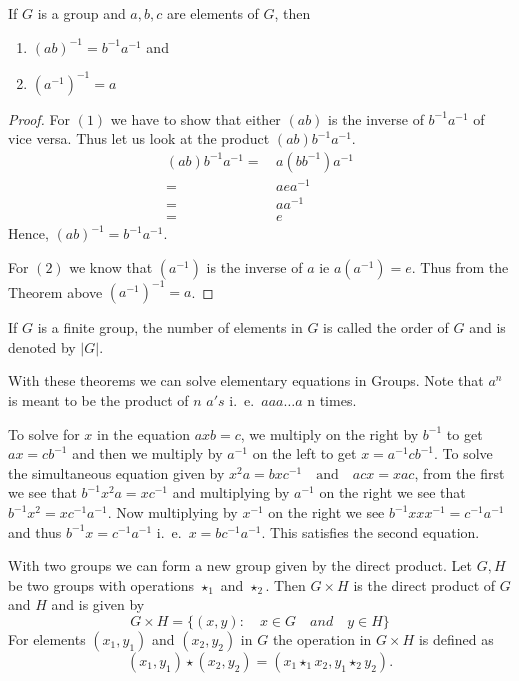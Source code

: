 \begin{Theorem}
    If $G$ is a group and $a,b,c$ are elements of $G$, then 
    \begin{enumerate}
	\item ${(ab)}^{-1} = b^{-1}a^{-1}$ and 
	\item ${(a^{-1})}^{-1} = a$
    \end{enumerate}
\end{Theorem}
\begin{proof}
    For $(1)$ we have to show that either $(ab)$ is the inverse of $b^{-1}a^{-1}$ of vice versa.
    Thus let us look at the product $(ab)b^{-1}a^{-1}$.
    \begin{align*}
	(ab)b^{-1}a^{-1} = & \, a(bb^{-1})a^{-1}  \\
	= & \, aea^{-1} \\
	= & \, aa^{-1} \\
	= & \, e
    \end{align*}
    Hence, ${(ab)}^{-1} = b^{-1}a^{-1}$.

    For $(2)$ we know that $(a^{-1})$ is the inverse of $a$ ie $a(a^{-1}) = e$. 
    Thus from the Theorem above ${(a^{-1})}^{-1} = a $.
\end{proof}

\begin{Definition}
    If $G$ is a finite group, the number of elements in $G$ is called the order of $G$ and is
    denoted by $\lvert G \rvert$. 
\end{Definition}

With these theorems we can solve elementary equations in Groups. Note that $a^n$ is meant to be the
product of $n$ $a's$ i.~e.~$aaa\ldots a$ n times.

To solve for $x$ in the equation $axb = c$, we multiply on the right by $b^{-1}$ to get $ax =
cb^{-1}$ and then we multiply by $a^{-1}$ on the left to get $x = a^{-1}cb^{-1}$. To solve the
simultaneous equation given by $x^2a = bxc^{-1} \quad \text{and} \quad acx = xac$, from the first we
see that $ b^{-1}x^2a = xc^{-1}$ and multiplying by $a^{-1}$ on the right we see that
$b^{-1}x^{2} = xc^{-1}a^{-1}$. Now multiplying by $x^{-1}$ on the right we see 
$b^{-1}xxx^{-1} = c^{-1}a^{-1}$ and thus $b^{-1}x = c^{-1}a^{-1}$ i.~e.~$x = bc^{-1}a^{-1}$. This
satisfies the second equation.  

With two groups we can form a new group given by the direct product. Let $G,H$ be two groups with
operations $\star_{1}$ and $\star_{2}$. Then $G \times H$ is the direct product of $G$ and $H$ and
is given by
\begin{equation*}
    G \times H = \lbrace (x,y) : \quad x \in G \quad and \quad y \in H \rbrace
\end{equation*}
For elements $(x_1,y_1)$ and $(x_2,y_2)$ in $G$ the operation in $G \times H$ is defined as
\[(x_1,y_1) \star (x_2,y_2) = (x_1\star_{1}x_2, y_1\star_{2}y_2).\]

